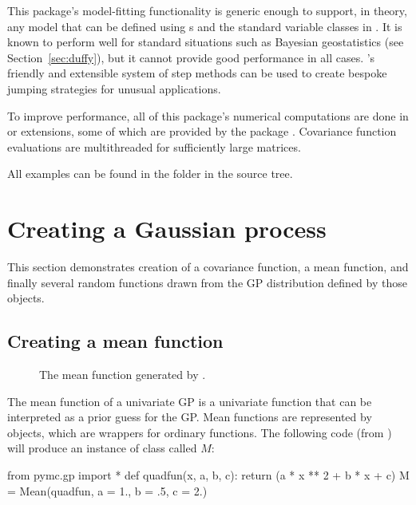 \documentclass[article]{jss}
\begin{document}
This package's model-fitting functionality is generic enough to support, in theory, any model that can be defined using s and the standard variable classes in . It is known to perform well for standard situations such as Bayesian geostatistics (see Section~\ref{sec:duffy}), but it cannot provide good performance in all cases. 's friendly and extensible system of step methods can be used to create bespoke jumping strategies for unusual applications.

To improve performance, all of this package's numerical computations are done in  or  extensions, some of which are provided by the  package \citep{numpybook}. Covariance function evaluations are multithreaded for sufficiently large matrices.

\medskip
All examples can be found in the folder  in the  source tree.


\section{Creating a Gaussian process}\label{sub:inst}

This section demonstrates creation of a covariance function, a mean function, and finally several random functions drawn from the GP distribution defined by those objects.

\subsection{Creating a mean function}\label{subsub:mean}

\begin{figure}
    \centering
    \caption{The mean function generated by .}
    \label{fig:mean}
\end{figure}

The mean function of a univariate GP is a univariate function that can be interpreted as a prior guess for the GP. Mean functions are represented by  objects, which are wrappers for ordinary  functions. The following code (from ) will produce an instance of class  called $M$:
\begin{CodeChunk}
\begin{CodeInput}
from pymc.gp import *
def quadfun(x, a, b, c):
    return (a * x ** 2 + b * x + c)
M = Mean(quadfun, a = 1., b = .5, c = 2.)        
\end{CodeInput}
\end{CodeChunk}
\end{document}
